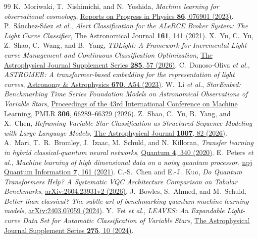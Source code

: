 \documentclass[aps,a4paper,onecolumn,11pt,unpublished]{quantumarticle}
\begin{document}
\begin{thebibliography}{99}
\footnotesize
{} K.~Moriwaki, T.~Nishimichi, and N.~Yoshida, \emph{Machine learning for observational cosmology}, \href{https://doi.org/10.1088/1361-6633/acd2ea}{Reports on Progress in Physics \textbf{86}, 076901 (2023)}.
 P.~S\'anchez-S\'aez \emph{et al.}, \emph{Alert Classification for the ALeRCE Broker System: The Light Curve Classifier}, \href{https://doi.org/10.3847/1538-3881/abd5c1}{The Astronomical Journal \textbf{161}, 141 (2021)}.
 X.~Yu, C.~Yu, Z.~Shao, C.~Wang, and B.~Yang, \emph{TDLight: A Framework for Incremental Light-curve Management and Continuous Classification Optimization}, \href{https://doi.org/10.3847/1538-4365/ae8300}{The Astrophysical Journal Supplement Series \textbf{285}, 57 (2026)}.
 C.~Donoso-Oliva \emph{et al.}, \emph{ASTROMER: A transformer-based embedding for the representation of light curves}, \href{https://doi.org/10.1051/0004-6361/202243928}{Astronomy \& Astrophysics \textbf{670}, A54 (2023)}.
 W.~Li \emph{et al.}, \emph{StarEmbed: Benchmarking Time Series Foundation Models on Astronomical Observations of Variable Stars}, \href{https://proceedings.mlr.press/v306/li26t.html}{Proceedings of the 43rd International Conference on Machine Learning, PMLR \textbf{306}, 66289--66329 (2026)}.
 Z.~Shao, C.~Yu, B.~Yang, and X.~Chen, \emph{Reframing Variable Star Classification as Structured Sequence Modeling with Large Language Models}, \href{https://doi.org/10.3847/1538-4357/ae8ade}{The Astrophysical Journal \textbf{1007}, 82 (2026)}.
 A.~Mari, T.~R.~Bromley, J.~Izaac, M.~Schuld, and N.~Killoran, \emph{Transfer learning in hybrid classical-quantum neural networks}, \href{https://doi.org/10.22331/q-2020-10-09-340}{Quantum \textbf{4}, 340 (2020)}.
 E.~Peters \emph{et al.}, \emph{Machine learning of high dimensional data on a noisy quantum processor}, \href{https://doi.org/10.1038/s41534-021-00498-9}{npj Quantum Information \textbf{7}, 161 (2021)}.
 C.-S.~Chen and E.-J.~Kuo, \emph{Do Quantum Transformers Help? A Systematic VQC Architecture Comparison on Tabular Benchmarks}, \href{https://arxiv.org/abs/2604.23931v2}{arXiv:2604.23931v2 (2026)}.
 J.~Bowles, S.~Ahmed, and M.~Schuld, \emph{Better than classical? The subtle art of benchmarking quantum machine learning models}, \href{https://arxiv.org/abs/2403.07059}{arXiv:2403.07059 (2024)}.
 Y.~Fei \emph{et al.}, \emph{LEAVES: An Expandable Light-curve Data Set for Automatic Classification of Variable Stars}, \href{https://doi.org/10.3847/1538-4365/ad785b}{The Astrophysical Journal Supplement Series \textbf{275}, 10 (2024)}.

\end{thebibliography}
\end{document}
